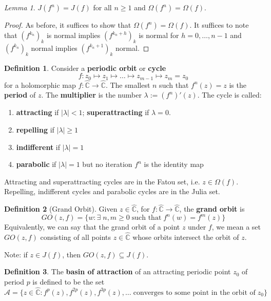 \documentclass[a4paper, 11pt]{book}
\theoremstyle{definition}
\newtheorem{definition}{Definition}[section]
\theoremstyle{remark}
\newtheorem{lemma}[theorem]{Lemma}
\begin{document}
    \begin{lemma}
        $J(f^n) = J(f)$ for all $n\geq 1$ and $\Omega(f^n) = \Omega(f)$.
    \end{lemma}
    \begin{proof}
        As before, it suffices to show that $\Omega(f^n) = \Omega(f)$. It suffices to note that $(f^{k_n})_k$ is normal implies
        $(f^{k_n+h})_k$ is normal for $h=0,\hdots,n-1$ and $(f^{k_n})_k$ normal implies $(f^{k_n+1})_k$ normal.
    \end{proof}

    \begin{definition}
        Consider a \textbf{periodic orbit} or \textbf{cycle}
        \[ f: z_0\mapsto z_1\mapsto \hdots \mapsto z_{m-1} \mapsto z_m = z_0 \]
        for a holomorphic map $f:\hat{\mathbb{C}}\to\hat{\mathbb{C}}$. The smallest $n$ such that $f^n(z)=z$ is the \textbf{period}
        of $z$. The \textbf{multiplier} is the number $\lambda:= (f^n)'(z)$. The cycle is called:
        \begin{enumerate}
            \item \textbf{attracting} if $|\lambda|<1$; \textbf{superattracting} if $\lambda =0$.
            \item \textbf{repelling} if $|\lambda|\geq 1$
            \item \textbf{indifferent} if $|\lambda| = 1$
            \item \textbf{parabolic} if $|\lambda|=1$ but no iteration $f^n$ is the identity map
        \end{enumerate}
        Attracting and superattracting cycles are in the Fatou set, i.e. $z\in\Omega(f)$. Repelling, indifferent cycles and
        parabolic cycles are in the Julia set.
    \end{definition}

    \begin{definition}[Grand Orbit]
        Given $z\in\hat{\mathbb{C}}$, for $f:\hat{\mathbb{C}}\to\hat{\mathbb{C}}$, the \textbf{grand orbit} is
        \[ GO(z,f) = \{w:\exists\;n,m\geq 0\;\text{such that}\;f^n(w)=f^m(z)\} \]
        Equivalently, we can say that the grand orbit of a point $z$ under $f$, we mean a set $GO(z,f)$ consisting
        of all points $z\in\hat{\mathbb{C}}$ whose orbits intersect the orbit of $z$.
    \end{definition}

    Note: if $z\in J(f)$, then $GO(z,f)\subseteq J(f)$.

    \begin{definition}
        The \textbf{basin of attraction} of an attracting periodic point $z_0$ of period $p$ is defined to be the set
        \[ \mathcal{A}=\{z\in\hat{\mathbb{C}}: f^{p}(z),f^{2p}(z),f^{3p}(z),\hdots\;\text{converges to some point in the 
                orbit of}\;z_0\} \]
    \end{definition}
\end{document}
